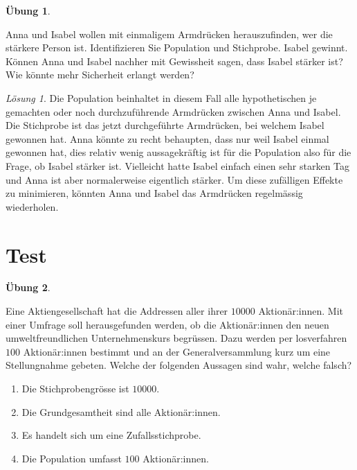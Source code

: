 \documentclass[
]{book}
\providecommand{\tightlist}{%
  \setlength{\itemsep}{0pt}\setlength{\parskip}{0pt}}
\theoremstyle{definition}
\theoremstyle{definition}
\theoremstyle{definition}
\newtheorem{exercise}{Übung}[chapter]
\theoremstyle{definition}
\theoremstyle{remark}
\newtheorem*{solution}{Lösung}
\begin{document}
\begin{exercise}
\protect\hypertarget{exr:armwrestling}{}\label{exr:armwrestling}\leavevmode

Anna und Isabel wollen mit einmaligem Armdrücken herauszufinden, wer die stärkere Person ist. Identifizieren Sie Population und Stichprobe. Isabel gewinnt. Können Anna und Isabel nachher mit Gewissheit sagen, dass Isabel stärker ist? Wie könnte mehr Sicherheit erlangt werden?

\end{exercise}

\begin{solution}
Die Population beinhaltet in diesem Fall alle hypothetischen je gemachten oder noch durchzuführende Armdrücken zwischen Anna und Isabel. Die Stichprobe ist das jetzt durchgeführte Armdrücken, bei welchem Isabel gewonnen hat. Anna könnte zu recht behaupten, dass nur weil Isabel einmal gewonnen hat, dies relativ wenig aussagekräftig ist für die Population also für die Frage, ob Isabel stärker ist. Vielleicht hatte Isabel einfach einen sehr starken Tag und Anna ist aber normalerweise eigentlich stärker. Um diese zufälligen Effekte zu minimieren, könnten Anna und Isabel das Armdrücken regelmässig wiederholen.
\end{solution}

\section{Test}\label{test}

\begin{exercise}
\protect\hypertarget{exr:tagname-apwioev}{}\label{exr:tagname-apwioev}\leavevmode

Eine Aktiengesellschaft hat die Addressen aller ihrer \(10000\) Aktionär:innen. Mit einer Umfrage soll herausgefunden werden, ob die Aktionär:innen den neuen umweltfreundlichen Unternehmenskurs begrüssen. Dazu werden per losverfahren \(100\) Aktionär:innen bestimmt und an der Generalversammlung kurz um eine Stellungnahme gebeten. Welche der folgenden Aussagen sind wahr, welche falsch?

\begin{enumerate}
\def\labelenumi{\alph{enumi})}
\tightlist
\item
  Die Stichprobengrösse ist \(10000\).
\item
  Die Grundgesamtheit sind alle Aktionär:innen.
\item
  Es handelt sich um eine Zufallsstichprobe.
\item
  Die Population umfasst \(100\) Aktionär:innen.
\end{enumerate}

\end{exercise}
\end{document}
